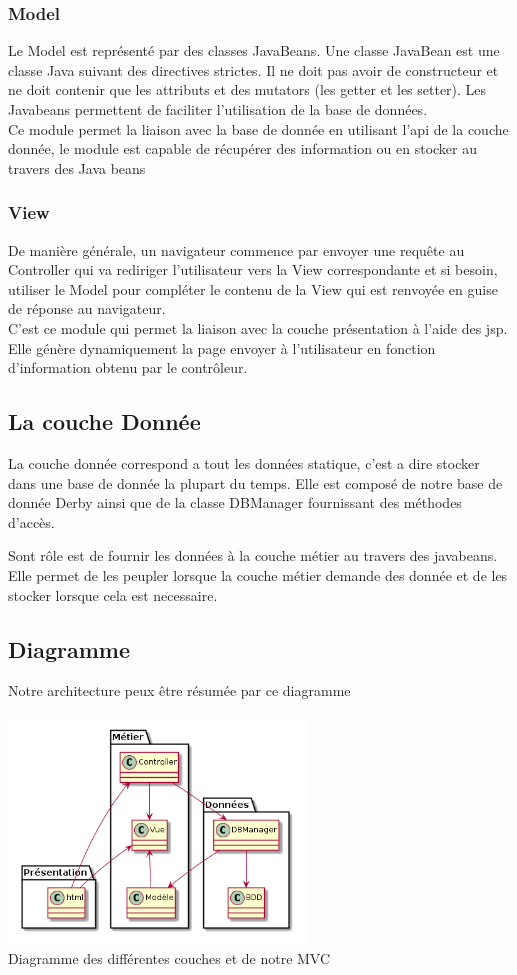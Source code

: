 \subsubsection{Model}
Le Model est représenté par des classes JavaBeans. Une classe JavaBean est une 
classe Java suivant des directives strictes. Il ne doit pas avoir de 
constructeur et ne doit contenir que les attributs et des mutators (les getter et les setter).
Les Javabeans permettent de faciliter l'utilisation de la base de données. \\
Ce module permet la liaison avec la base de donnée en utilisant l'api de la couche donnée, le module est capable de récupérer des information ou en stocker au travers des Java beans

\subsubsection{View}
De manière générale, un navigateur commence par envoyer une requête au 
Controller qui va rediriger l'utilisateur vers la View correspondante et si 
besoin, utiliser le Model pour compléter le contenu de la View qui est renvoyée en guise de réponse au navigateur.\\
C'est ce module qui permet la liaison avec la couche présentation à l'aide des jsp.
Elle génère dynamiquement la page envoyer à l'utilisateur en fonction d'information obtenu par le contrôleur.

\subsection{La couche Donnée}
La couche donnée correspond a tout les données statique, c'est a dire stocker dans une base de donnée la plupart du temps.
Elle est composé de notre base de donnée Derby ainsi que de la classe DBManager fournissant des méthodes d'accès.

Sont rôle est de fournir les données à la couche métier au travers des javabeans.
Elle permet de les peupler lorsque la couche métier demande des donnée et de les stocker lorsque cela est necessaire.

\subsection{Diagramme}
Notre architecture peux être résumée par ce diagramme
\begin{center}
\includegraphics[width=0.6\textwidth]{img/uml}\\
Diagramme des différentes couches et de notre MVC
\end{center}

